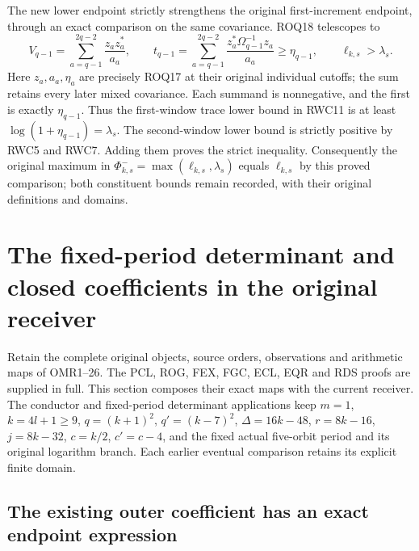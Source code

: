 \documentclass[11pt,a4paper]{article}
\begin{document}
The new lower endpoint strictly strengthens the original first-increment
endpoint, through an exact comparison on the same covariance. ROQ18
telescopes to
\begin{equation}\tag{RWC14}
V_{q-1}=\sum_{a=q-1}^{2q-2}\frac{z_az_a^*}{a_a},\qquad
t_{q-1}=\sum_{a=q-1}^{2q-2}
\frac{z_a^*\Omega_{q-1}^{-1}z_a}{a_a}
\ge\eta_{q-1},\qquad \ell_{k,s}>\lambda_s.
\end{equation}
Here $z_a,a_a,\eta_a$ are precisely ROQ17 at their original
individual cutoffs; the sum retains every later mixed covariance.
Each summand is nonnegative, and the first is exactly
$\eta_{q-1}$. Thus the first-window trace lower bound in RWC11
is at least $\log(1+\eta_{q-1})=\lambda_s$. The second-window
lower bound is strictly positive by RWC5 and RWC7. Adding them
proves the strict inequality. Consequently the original maximum
in $\Phi^-_{k,s}=\max(\ell_{k,s},\lambda_s)$ equals
$\ell_{k,s}$ by this proved comparison; both constituent bounds
remain recorded, with their original definitions and domains.


\clearpage
\section{The fixed-period determinant and closed coefficients in the original receiver}
\label{sec:OER}

Retain the complete original objects, source orders, observations and
arithmetic maps of OMR1--26. The PCL, ROG, FEX, FGC, ECL, EQR and RDS
proofs are supplied in full. This section composes their exact maps
with the current receiver. The conductor and fixed-period determinant
applications keep $m=1$, $k=4l+1\ge9$, $q=(k+1)^2$,
$q'=(k-7)^2$, $\Delta=16k-48$, $r=8k-16$, $j=8k-32$,
$c=k/2$, $c'=c-4$, and the fixed actual five-orbit period and
its original logarithm branch. Each earlier eventual comparison
retains its explicit finite domain.

\subsection{The existing outer coefficient has an exact endpoint expression}
\end{document}
